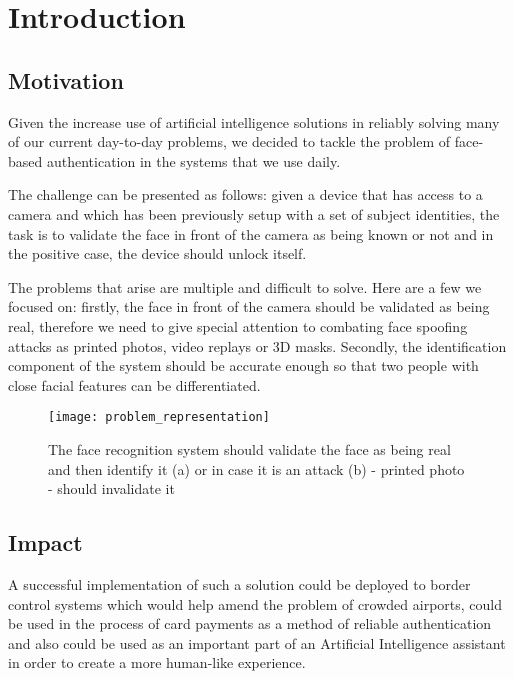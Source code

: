 \afterpage{\blankpage}
\chapter{Introduction}

\section{Motivation}

Given the increase use of artificial intelligence solutions in reliably solving many of our current day-to-day problems, we decided to tackle the problem of face-based authentication in the systems that we use daily.

The challenge can be presented as follows: given a device that has access to a camera and which has been previously setup with a set of subject identities, the task is to validate the face in front of the camera as being known or not and in the positive case, the device should unlock itself.

The problems that arise are multiple and difficult to solve. Here are a few we focused on: firstly, the face in front of the camera should be validated as being real, therefore we need to give special attention to combating face spoofing attacks as printed photos, video replays or 3D masks. Secondly, the identification component of the system should be accurate enough so that two people with close facial features can be differentiated.

\begin{figure}[h]
	\begin{center}
		\texttt{[image: problem\_representation]}
		\caption[Desired behaviour of the face recognition system]{The face recognition system should validate the face as being real and then identify it (a) or in case it is an attack (b) - printed photo - should invalidate it}
	\end{center}
\end{figure}

\section{Impact}
A successful implementation of such a solution could be deployed to border control systems which would help amend the problem of crowded airports, could be used in the process of card payments as a method of reliable authentication and also could be used as an important part of an Artificial Intelligence assistant in order to create a more human-like experience.

